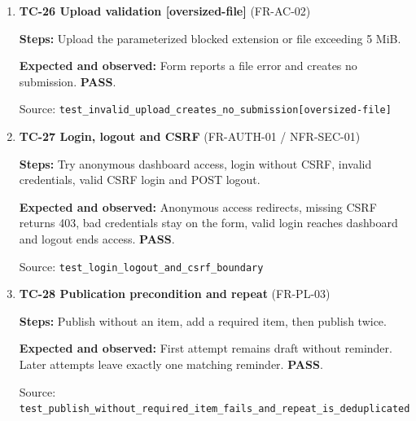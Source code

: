 \begin{enumerate}
\begin{minipage}[t]{\linewidth}
{\footnotesize Source: \nolinkurl{test_invalid_upload_creates_no_submission[blocked-extension]}}\end{minipage}

\item \begin{minipage}[t]{\linewidth}\textbf{TC-26 Upload validation [oversized-file]} (FR-AC-02)\par

\textbf{Steps:} Upload the parameterized blocked extension or file exceeding 5 MiB.\par

\textbf{Expected and observed:} Form reports a file error and creates no submission. \textbf{PASS}.\par

{\footnotesize Source: \nolinkurl{test_invalid_upload_creates_no_submission[oversized-file]}}\end{minipage}

\item \begin{minipage}[t]{\linewidth}\textbf{TC-27 Login, logout and CSRF } (FR-AUTH-01 / NFR-SEC-01)\par

\textbf{Steps:} Try anonymous dashboard access, login without CSRF, invalid credentials, valid CSRF login and POST logout.\par

\textbf{Expected and observed:} Anonymous access redirects, missing CSRF returns 403, bad credentials stay on the form, valid login reaches dashboard and logout ends access. \textbf{PASS}.\par

{\footnotesize Source: \nolinkurl{test_login_logout_and_csrf_boundary}}\end{minipage}

\item \begin{minipage}[t]{\linewidth}\textbf{TC-28 Publication precondition and repeat } (FR-PL-03)\par

\textbf{Steps:} Publish without an item, add a required item, then publish twice.\par

\textbf{Expected and observed:} First attempt remains draft without reminder. Later attempts leave exactly one matching reminder. \textbf{PASS}.\par

{\footnotesize Source: \nolinkurl{test_publish_without_required_item_fails_and_repeat_is_deduplicated}}\end{minipage}


\end{enumerate}
